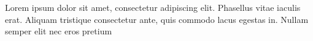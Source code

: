 \paginasiniciais


Lorem ipsum dolor sit amet, consectetur adipiscing elit. Phasellus vitae iaculis erat. Aliquam tristique consectetur ante, quis commodo lacus egestas in. Nullam semper elit nec eros pretium 


%




\begin{resumo}
\lorenipsuns
\end{resumo}


\begin{abstract}

\lorenipsuns

\end{abstract}




\listoffigures

\listoftables





\tableofcontents


\fimdaspaginasiniciais
